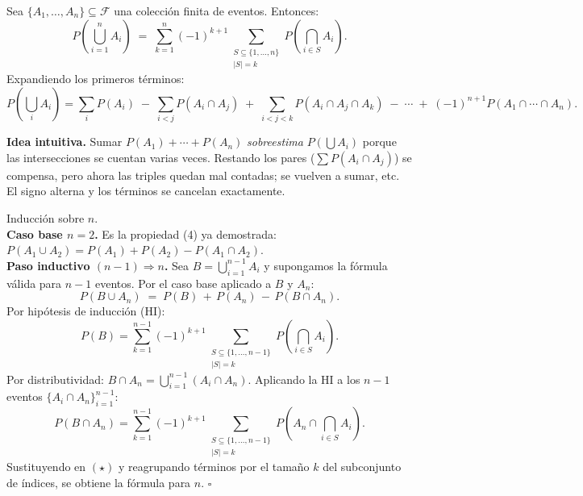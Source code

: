 \documentclass[10pt,a4paper]{article}
\numberwithin{equation}{section}
\newcommand{\sigalg}{\mathcal{F}}
\newcounter{thmcount}[section]
\renewcommand{\thethmcount}{\thesection.\arabic{thmcount}}
\newenvironment{teorema}[1]{%
  \refstepcounter{thmcount}%
  \begin{tcolorbox}[thmbox, title={Teorema \thethmcount\ \textperiodcentered\ #1}]%
}{\end{tcolorbox}}
\newenvironment{nota}{\begin{tcolorbox}[notebox]}{\end{tcolorbox}}
\newenvironment{demostracion}{\begin{tcolorbox}[proofbox]}{\hfill$\square$\end{tcolorbox}}
\begin{document}
\begin{teorema}{Principio de inclusi\'on y exclusi\'on}
  Sea $\{A_1, \ldots, A_n\} \subseteq \sigalg$ una colecci\'on finita de eventos. Entonces:
  \[
    P\!\left(\bigcup_{i=1}^{n} A_i\right)
    \;=\; \sum_{k=1}^{n} (-1)^{k+1}
    \sum_{\substack{S\subseteq\{1,\ldots,n\}\\|S|=k}} P\!\left(\bigcap_{i\in S} A_i\right).
  \]
  Expandiendo los primeros t\'erminos:
  \[
    P\!\left(\bigcup_i A_i\right) = \sum_i P(A_i) \;-\; \sum_{i<j} P(A_i\cap A_j)
    \;+\; \sum_{i<j<k} P(A_i\cap A_j\cap A_k) \;-\; \cdots
    \;+\; (-1)^{n+1} P(A_1\cap\cdots\cap A_n).
  \]
\end{teorema}

\begin{nota}
  \textbf{Idea intuitiva.} Sumar $P(A_1)+\cdots+P(A_n)$ \emph{sobreestima} $P(\bigcup A_i)$
  porque las intersecciones se cuentan varias veces. Restando los pares ($\sum P(A_i\cap A_j)$)
  se compensa, pero ahora las triples quedan mal contadas; se vuelven a sumar, etc.
  El signo alterna y los t\'erminos se cancelan exactamente.
\end{nota}

\begin{demostracion}
  Inducci\'on sobre $n$.
  \\[5pt]
  \textbf{Caso base $n=2$.} Es la propiedad (4) ya demostrada:
  $P(A_1\cup A_2) = P(A_1)+P(A_2)-P(A_1\cap A_2)$.
  \\[5pt]
  \textbf{Paso inductivo $(n-1)\Rightarrow n$.}
  Sea $B = \bigcup_{i=1}^{n-1} A_i$ y supongamos la f\'ormula v\'alida para $n-1$ eventos.
  Por el caso base aplicado a $B$ y $A_n$:
  \begin{equation}
    P(B \cup A_n) \;=\; P(B) \,+\, P(A_n) \,-\, P(B \cap A_n). \tag{$\star$}
  \end{equation}
  Por hip\'otesis de inducci\'on (HI):
  \[
    P(B) = \sum_{k=1}^{n-1} (-1)^{k+1}
    \sum_{\substack{S\subseteq\{1,\ldots,n-1\}\\|S|=k}} P\!\left(\bigcap_{i\in S} A_i\right).
  \]
  Por distributividad: $B\cap A_n = \bigcup_{i=1}^{n-1}(A_i \cap A_n)$. Aplicando la HI
  a los $n-1$ eventos $\{A_i \cap A_n\}_{i=1}^{n-1}$:
  \[
    P(B\cap A_n) = \sum_{k=1}^{n-1} (-1)^{k+1}
    \sum_{\substack{S\subseteq\{1,\ldots,n-1\}\\|S|=k}}
    P\!\left(A_n \cap \bigcap_{i\in S} A_i\right).
  \]
  Sustituyendo en $(\star)$ y reagrupando t\'erminos por el tama\~no $k$ del subconjunto
  de \'indices, se obtiene la f\'ormula para $n$.
\end{demostracion}
\end{document}
